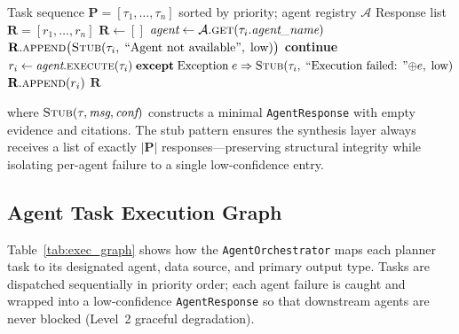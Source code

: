 \documentclass[preprint,12pt]{elsarticle}
\renewcommand{\P}{\mathbf{P}}
\newcommand{\R}{\mathbf{R}}
\newcommand{\calA}{\mathcal{A}}
\begin{document}
\begin{algorithm}[t]
\caption{Agent Orchestration Protocol}
\label{alg:orchestrate}
\begin{algorithmic}[1]
\Require Task sequence $\P = [\tau_1,\ldots,\tau_n]$ sorted by priority;
         agent registry $\calA$
\Ensure Response list $\R = [r_1,\ldots,r_n]$
\State $\R \leftarrow []$
\For{each $\tau_i \in \P$}
  \State $\textit{agent} \leftarrow \calA.\textsc{get}(\tau_i.\textit{agent\_name})$
    \State $\R.\textsc{append}\bigl(\textsc{Stub}(\tau_i,\;\text{``Agent not available''},\;\text{low})\bigr)$
    \State \textbf{continue}
  \EndIf
  \State $r_i \leftarrow \textit{agent}.\textsc{execute}(\tau_i)
         \;\mathbf{except}\;\text{Exception}\;e\Rightarrow
         \textsc{Stub}(\tau_i,\;\text{``Execution failed: ''}{\oplus}e,\;\text{low})$
  \State $\R.\textsc{append}(r_i)$
\EndFor
\State \Return $\R$
\end{algorithmic}
\end{algorithm}

\noindent where $\textsc{Stub}(\tau, \textit{msg}, \textit{conf})$ constructs a
minimal \texttt{AgentResponse} with empty evidence and citations.
The stub pattern ensures the synthesis layer always receives a list of
exactly $|\P|$ responses---preserving structural integrity while isolating
per-agent failure to a single low-confidence entry.

\subsection{Agent Task Execution Graph}
\label{sec:exec_graph}

Table~\ref{tab:exec_graph} shows how the \texttt{AgentOrchestrator} maps each
planner task to its designated agent, data source, and primary output type.
Tasks are dispatched sequentially in priority order; each agent failure is
caught and wrapped into a low-confidence \texttt{AgentResponse} so that
downstream agents are never blocked (Level~2 graceful degradation).
\end{document}
